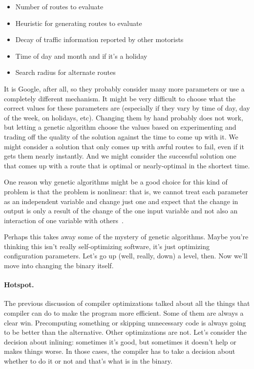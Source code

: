 \begin{itemize}
	\item Number of routes to evaluate
	\item Heuristic for generating routes to evaluate
	\item Decay of traffic information reported by other motorists
	\item Time of day and month and if it's a holiday
	\item Search radius for alternate routes
\end{itemize}

It is Google, after all, so they probably consider many more parameters or use a completely different mechanism. It might be very difficult to choose what the correct values for these parameters are (especially if they vary by time of day, day of the week, on holidays, etc). Changing them by hand probably does not work, but letting a genetic algorithm choose the values based on experimenting and trading off the quality of the solution against the time to come up with it. We might consider a solution that only comes up with awful routes to fail, even if it gets them nearly instantly. And we might consider the successful solution one that comes up with a route that is optimal or nearly-optimal in the shortest time.

One reason why genetic algorithms might be a good choice for this kind of problem is that the problem is nonlinear: that is, we cannot treat each parameter as an independent variable and change just one and expect that the change in output is only a result of the change of the one input variable and not also an interaction of one variable with others~\cite{genetic}.

Perhaps this takes away some of the mystery of genetic algorithms. Maybe you're thinking this isn't really self-optimizing software, it's just optimizing configuration parameters. Let's go up (well, really, down) a level, then. Now we'll move into changing the binary itself.

\paragraph{Hotspot.}
The previous discussion of compiler optimizations talked about all the things that compiler can do to make the program more efficient. Some of them are always a clear win. Precomputing something or skipping unnecessary code is always going to be better than the alternative. Other optimizations are not. Let's consider the decision about inlining: sometimes it's good, but sometimes it doesn't help or makes things worse. In those cases, the compiler has to take a decision about whether to do it or not and that's what is in the binary.

